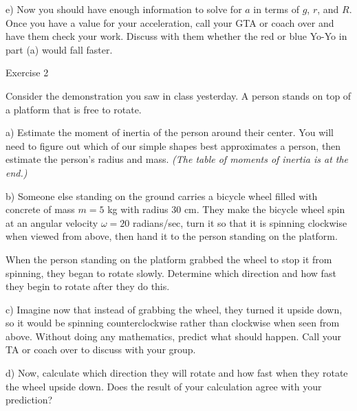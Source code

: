\documentclass[12pt]{article}
\begin{document}
\vspace{1in}

e) Now you should have enough information to solve for $a$ in terms of $g$, $r$, and $R$. Once you have a value for your acceleration, call your GTA or coach over and have them check your work. Discuss with them whether the red or blue Yo-Yo in part (a) would fall faster. 

\newpage

\begin{center}
	\Large Exercise 2
\end{center}

Consider the demonstration you saw in class yesterday. A person stands on top of a platform that is free to rotate.

a) Estimate the moment of inertia of the person around their center. You will need to figure out which of our simple shapes best approximates a person, then estimate the person's radius and mass. \textit{(The table of moments of inertia is at the end.)}

\vspace{1in}

b) Someone else standing on the ground carries a bicycle wheel filled with concrete of mass $m=5$ kg with radius 30 cm. They make the bicycle wheel spin at an angular velocity $\omega = 20$ radians/sec, turn it so that it is spinning clockwise when viewed from above, then hand it to the person standing on the platform. 

When the person standing on the platform grabbed the wheel to stop it from spinning, they began to rotate slowly. Determine which direction and how fast they begin to rotate after they do this.

\vspace{3in}
\newpage

c) Imagine now that instead of grabbing the wheel, they turned it upside down, so it would be spinning counterclockwise rather than clockwise when seen from above. Without doing any mathematics, predict what should happen. Call your TA or coach over to discuss with your group.

\vspace{2in}

d) Now, calculate which direction they will rotate and how fast when they rotate the wheel upside down. Does the result of your calculation agree with your prediction?
\vfill
\end{document}
